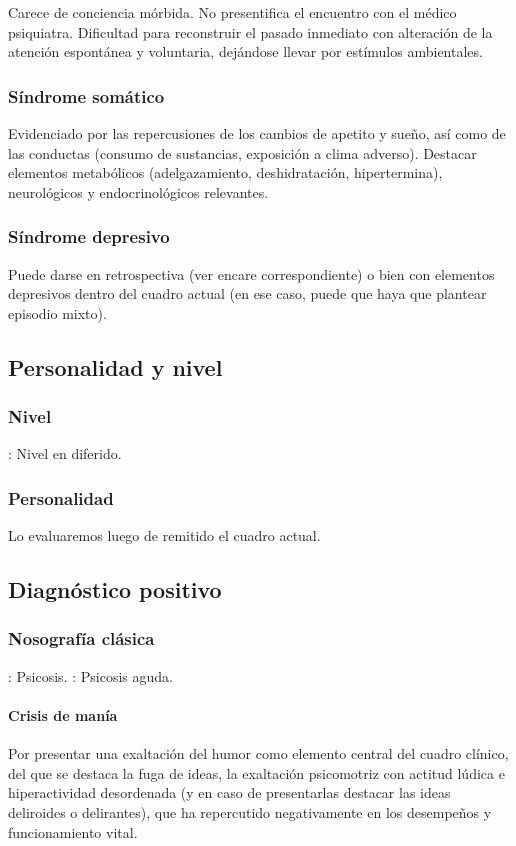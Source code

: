 \documentclass{scrbook}
\begin{document}
Carece de conciencia mórbida. No presentifica el encuentro con el médico psiquiatra. Dificultad para reconstruir el pasado inmediato con alteración de la atención espontánea y voluntaria, dejándose llevar por estímulos ambientales.
\subsubsection*{Síndrome somático}
Evidenciado por las repercusiones de los cambios de apetito y sueño, así como de las conductas (consumo de sustancias, exposición a clima adverso). Destacar elementos metabólicos (adelgazamiento, deshidratación, hipertermina), neurológicos y endocrinológicos relevantes.
\subsubsection*{Síndrome depresivo}
Puede darse en retrospectiva (ver encare correspondiente) o bien con elementos depresivos dentro del cuadro actual (en ese caso, puede que haya que plantear episodio mixto).
\subsection*{Personalidad y nivel}
\subsubsection*{Nivel}
\faPaste: Nivel en diferido.
\subsubsection*{Personalidad}
Lo evaluaremos luego de remitido el cuadro actual.
\subsection*{Diagnóstico positivo}
\subsubsection*{Nosografía clásica}
\faPaste: Psicosis.
\faPaste: Psicosis aguda.
\paragraph{Crisis de manía}
Por presentar una exaltación del humor como elemento central del cuadro clínico, del que se destaca la fuga de ideas, la exaltación psicomotriz con actitud lúdica e hiperactividad desordenada (y en caso de presentarlas destacar las ideas deliroides o delirantes), que ha repercutido negativamente en los desempeños y funcionamiento vital.
\end{document}
